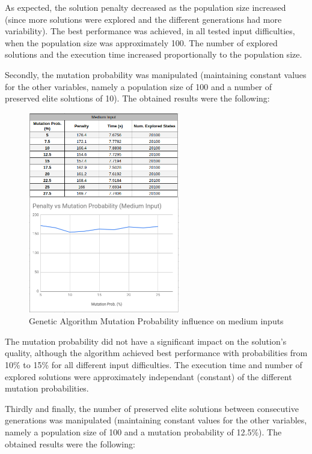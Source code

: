 \documentclass[conference]{IEEEtran}
\begin{document}
As expected, the solution penalty decreased as the population size increased (since more solutions were explored and the different generations had more variability). The best performance was achieved, in all tested input difficulties, when the population size was approximately 100. The number of explored solutions and the execution time increased proportionally to the population size. 

Secondly, the mutation probability was manipulated (maintaining constant values for the other variables, namely a population size of 100 and a number of preserved elite solutions of 10). The obtained results were the following: 

\begin{figure}[H]
    \centerline{\includegraphics[width=250px]{mutation_prob_medium.png}}
    \caption{Genetic Algorithm Mutation Probability influence on medium inputs}
\end{figure}

The mutation probability did not have a significant impact on the solution's quality, although the algorithm achieved best performance with probabilities from 10\% to 15\% for all different input difficulties. The execution time and number of explored solutions were approximately independant (constant) of the different mutation probabilities.

Thirdly and finally, the number of preserved elite solutions between consecutive generations was manipulated (maintaining constant values for the other variables, namely a population size of 100 and a mutation probability of 12.5\%). The obtained results were the following: 
\end{document}
